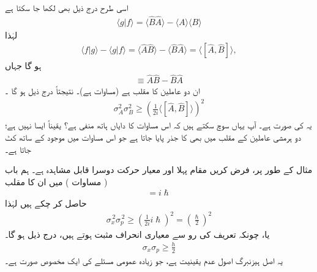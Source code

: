 اسی طرح درج ذیل بھی لکھا جا سکتا ہے 
\begin{align*}
\langle g|f \rangle = \langle \hat{B}\hat{A} \rangle - \langle A \rangle \langle B \rangle 
\end{align*}
لہٰذا 
\begin{align*}
\langle f|g \rangle - \langle g|f \rangle = \langle \hat{A}\hat{B} \rangle -\langle \hat{B}\hat{A} \rangle = \langle [ \hat{A} , \hat{B}] \rangle ,
\end{align*}
ہو گا  جہاں
\begin{align*}
[\hat{A} , \hat{B}] \equiv \hat{A} \hat{B} - \hat{B}\hat{A}
\end{align*}
 ان دو عاملین کا  مقلب  ہے   (مساوات  ہے)۔ نتیجتاً  درج ذیل ہو گا ۔
\begin{align}\label{مساوات_قواعد_عمومی_اصول_عدم_یقینیت_الف_بے}
\sigma_{A}^{2} \sigma_{B}^{2} \geq \left(\frac{1}{2i} \langle [\hat{A} , \hat{B}] \rangle \right)^{2}
\end{align}
یہ     کی صورت ہے۔ آپ یہاں سوچ سکتے ہیں کہ اس  مساوات کا دایاں ہاتھ منفی ہے؟ یقیناً ایسا نہیں ہے؛  دو ہرمشی عاملین کے مقلب میں بھی   کا جذر  پایا جاتا ہے جو اس  مساوات میں موجود  کے ساتھ کٹ جاتا ہے۔ 

مثال کے طور پر، فرض کریں   مقام   پہلا   اور   معیار حرکت  دوسرا قابل مشاہدہ   ہے۔  ہم باب    ( مساوات )    میں ان کا مقلب
\begin{align*}
[ \hat{x}, \hat{p} ] = i \hslash
\end{align*}
حاصل کر چکے ہیں لہٰذا
\begin{align*}
\sigma_{x}^{\,2} \sigma_{p}^{\,2} \geq \left( \frac{1}{2i} i \hslash \right)^{2} = \left( \frac{\hslash}{2} \right)^{2}
\end{align*}
یا،   چونکہ تعریف کی رو سے معیاری انحراف مثبت ہوتے ہیں،   درج ذیل ہو گا۔
\begin{align}
\sigma_{x} \sigma_{p} \geq \frac{h}{2}
\end{align}
یہ اصل  ہیزنبرگ   اصول  عدم یقینیت  ہے،  جو  زیادہ عمومی مسئلے کی ایک مخصوص صورت ہے۔

